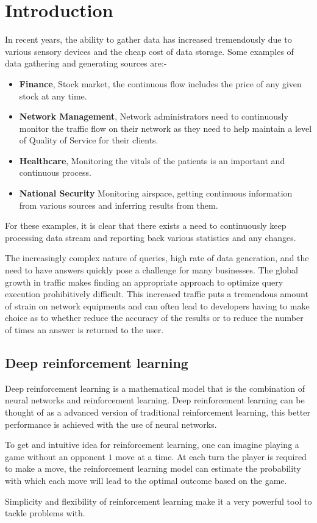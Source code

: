 \chapter{Introduction}
\label{chapter:Introduction}
\thispagestyle{myheadings}
In recent years, the ability to gather data has increased tremendously due to various sensory devices and the cheap cost of data storage. Some examples of data gathering and generating sources are:-
\begin{itemize}
    \item \textbf{Finance}, Stock market, the continuous flow includes the price of any given stock at any time. 
    \item \textbf{Network Management}, Network administrators need to continuously monitor the traffic flow on their network as they need to help maintain a level of Quality of Service for their clients.
    \item \textbf{Healthcare}, Monitoring the vitals of the patients is an important and continuous process. 
    \item \textbf{National Security} Monitoring airspace, getting continuous information from various sources and inferring results from them.
\end{itemize} 
For these examples, it is clear that there exists a need to continuously keep processing data stream and reporting back various statistics and any changes.
\par The increasingly complex nature of queries, high rate of data generation, and the need to have answers quickly pose a challenge for many businesses. The global growth in traffic makes finding an appropriate approach to optimize query execution prohibitively difficult. This increased traffic puts a tremendous amount of strain on network equipments and can often lead to developers having to make choice as to whether reduce the accuracy of the results or to reduce the number of times an answer is returned to the user.  

\section{Deep reinforcement learning}
Deep reinforcement learning is a mathematical model that is the combination of neural networks and reinforcement learning. Deep reinforcement learning can be thought of as a advanced version of traditional reinforcement learning, this better performance is achieved with the use of neural networks.
\par To get and intuitive idea for reinforcement learning, one can imagine playing a game without an opponent $1$ move at a time. At each turn the player is required to make a move, the reinforcement learning model can estimate the probability with which each move will lead to the optimal outcome based on the game.
\par Simplicity and flexibility of reinforcement learning make it a very powerful tool to tackle problems with. 
